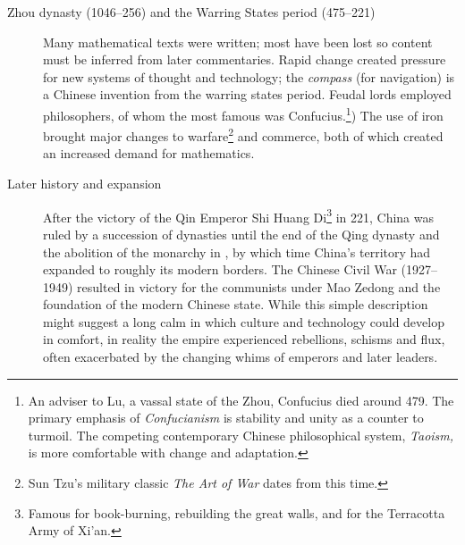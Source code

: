 \begin{description}
  \item[Zhou dynasty (1046--256\BC) and the Warring States period (475--221\BC)] Many mathematical texts were written; most have been lost so content must be inferred from later commentaries. Rapid change created pressure for new systems of thought and technology; the \emph{compass} (for navigation) is a Chinese invention from the warring states period. Feudal lords employed philosophers, of whom the most famous was Confucius.\footnote{An adviser to Lu, a vassal state of the Zhou, Confucius died around 479\BC. The primary emphasis of \emph{Confucianism} is stability and unity as a counter to turmoil. The competing contemporary Chinese philosophical system, \emph{Taoism,} is more comfortable with change and adaptation.}) The use of iron brought major changes to warfare\footnote{Sun Tzu's military classic \emph{The Art of War} dates from this time.} and commerce, both of which created an increased demand for mathematics.
  
  \item[Later history and expansion] After the victory of the Qin Emperor Shi Huang Di\footnote{Famous for book-burning, rebuilding the great walls, and for the Terracotta Army of Xi'an.} in 221\BC, China was ruled by a succession of dynasties until the end of the Qing dynasty and the abolition of the monarchy in , by which time China's territory had expanded to roughly its modern borders. The Chinese Civil War (1927--1949) resulted in victory for the communists under Mao Zedong and the foundation of the modern Chinese state. While this simple description might suggest a long calm in which culture and technology could develop in comfort, in reality the empire experienced rebellions, schisms and flux, often exacerbated by the changing whims of emperors and later leaders. %
  

\end{description}
